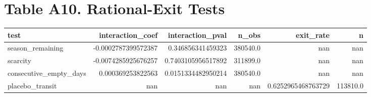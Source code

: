 \documentclass{article}
\begin{document}
\section*{Table A10. Rational-Exit Tests}
\begin{tabular}{lrrrrr}
\hline
test & interaction_coef & interaction_pval & n_obs & exit_rate & n \\
\hline
season\_remaining & -0.0002787399572387 & 0.346856341459323 & 380540.0 & nan & nan \\
scarcity & -0.0074285925676257 & 0.7403105956517892 & 311899.0 & nan & nan \\
consecutive\_empty\_days & 0.000369253822563 & 0.0151334482950214 & 380540.0 & nan & nan \\
placebo\_transit & nan & nan & nan & 0.6252965468763729 & 113810.0 \\
\hline
\end{tabular}
\end{document}
